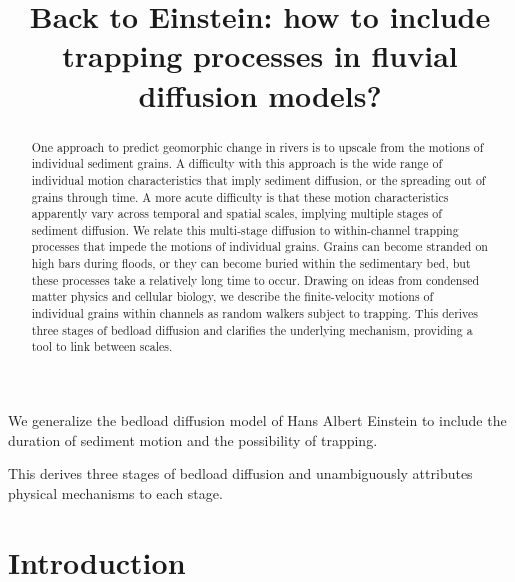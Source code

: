 \documentclass[]{agujournal2018}
\begin{document}
\title{Back to Einstein: how to include trapping processes in fluvial diffusion models?}


\begin{keypoints}
\item We generalize the bedload diffusion model of Hans Albert Einstein to include the duration of sediment motion and the possibility of trapping.
\item This derives three stages of bedload diffusion and unambiguously attributes physical mechanisms to each stage.
\end{keypoints}

\begin{abstract}
One approach to predict geomorphic change in rivers is to upscale from the motions of individual sediment grains. A difficulty with this approach is the wide range of individual motion characteristics that imply sediment diffusion, or the spreading out of grains through time. A more acute difficulty is that these motion characteristics apparently vary across temporal and spatial scales, implying multiple stages of sediment diffusion. We relate this multi-stage diffusion to within-channel trapping processes that impede the motions of individual grains. Grains can become stranded on high bars during floods, or they can become buried within the sedimentary bed, but these processes take a relatively long time to occur. Drawing on ideas from condensed matter physics and cellular biology, we describe the finite-velocity motions of individual grains within channels as random walkers subject to trapping. This derives three stages of bedload diffusion and clarifies the underlying mechanism, providing a tool to link between scales.
\end{abstract}

\section{Introduction}
\end{document}
